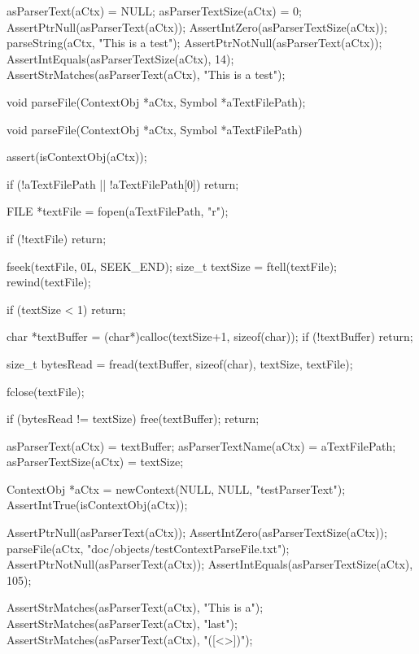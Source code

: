   asParserText(aCtx)     = NULL;
  asParserTextSize(aCtx) = 0;
  AssertPtrNull(asParserText(aCtx));
  AssertIntZero(asParserTextSize(aCtx));
  parseString(aCtx, "This is a test");
  AssertPtrNotNull(asParserText(aCtx));
  AssertIntEquals(asParserTextSize(aCtx), 14);
  AssertStrMatches(asParserText(aCtx), "This is a test");
\stopCTest
\stopTestCase
\stopTestSuite

\startTestSuite[parseFile]

\startCHeader
void parseFile(ContextObj *aCtx, Symbol *aTextFilePath);
\stopCHeader

\startCCode
void parseFile(ContextObj *aCtx, Symbol *aTextFilePath) {
  assert(isContextObj(aCtx));
  
  if (!aTextFilePath || !aTextFilePath[0]) return;
  
  FILE *textFile = fopen(aTextFilePath, "r");
  
  if (!textFile) return;
  
  fseek(textFile, 0L, SEEK_END);
  size_t textSize = ftell(textFile);
  rewind(textFile);
  
  if (textSize < 1) return;
  
  char *textBuffer = (char*)calloc(textSize+1, sizeof(char));
  if (!textBuffer) return;
  
  size_t bytesRead = fread(textBuffer, sizeof(char), textSize, textFile);

  fclose(textFile);
  
  if (bytesRead != textSize) {
    free(textBuffer);
    return;
  }

  asParserText(aCtx)     = textBuffer;
  asParserTextName(aCtx) = aTextFilePath;
  asParserTextSize(aCtx) = textSize;
}
\stopCCode


\startCTest
  ContextObj *aCtx = newContext(NULL, NULL, "testParserText");
  AssertIntTrue(isContextObj(aCtx));
  
  AssertPtrNull(asParserText(aCtx));
  AssertIntZero(asParserTextSize(aCtx));
  parseFile(aCtx, "doc/objects/testContextParseFile.txt");
  AssertPtrNotNull(asParserText(aCtx));
  AssertIntEquals(asParserTextSize(aCtx), 105);
  
  AssertStrMatches(asParserText(aCtx), "This is a");
  AssertStrMatches(asParserText(aCtx), "last");
  AssertStrMatches(asParserText(aCtx), "([<{}>])");
\stopCTest
\stopTestCase
\stopTestSuite

\startTestSuite[reinitializeRenderer]

